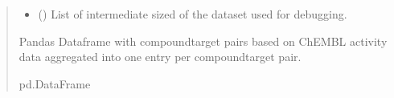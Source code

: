 \documentclass[letterpaper,10pt,english]{sphinxmanual}
\begin{document}
\begin{fulllineitems}
\begin{quote}
\begin{description}
\begin{itemize}
\item {} 
\sphinxAtStartPar
{} (\sphinxstyleliteralemphasis{\sphinxupquote{{[}}}\sphinxstyleliteralemphasis{\sphinxupquote{{[}}}\sphinxstyleliteralemphasis{\sphinxupquote{{]}}}\sphinxstyleliteralemphasis{\sphinxupquote{, }}\sphinxstyleliteralemphasis{\sphinxupquote{{[}}}\sphinxstyleliteralemphasis{\sphinxupquote{{]}}}\sphinxstyleliteralemphasis{\sphinxupquote{{]}}}) \textendash{} List of intermediate sized of the dataset used for debugging.

\end{itemize}

\sphinxAtStartPar
Pandas Dataframe with compound\sphinxhyphen{}target pairs based on ChEMBL activity data aggregated into one entry per compound\sphinxhyphen{}target pair.

\sphinxAtStartPar
pd.DataFrame

\end{description}\end{quote}

\end{fulllineitems}

\end{document}
